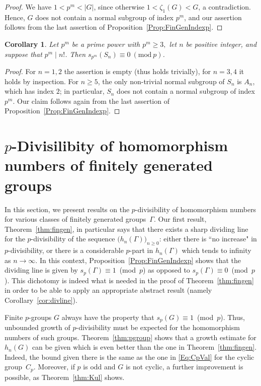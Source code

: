 \documentclass[12pt,reqno]{amsart}
\numberwithin{equation}{section}
\newtheorem{corollary}[theorem]{Corollary}
\theoremstyle{remark}
\begin{document}
\begin{proof}
We have $1 < p^m < \vert G\vert$, since otherwise $1<\zeta_1(G) < G$,
a contradiction. Hence, $G$ does not contain a normal subgroup of
index $p^m$, and our assertion  follows from 
the last assertion of Proposition~\ref{Prop:FinGenIndexp}.  
\end{proof}

\begin{corollary} \label{cor:pm2}
Let\/ $p^m$ be a prime power with $p^m\geq3,$ let $n$ be positive
integer, and suppose that $p^m \mid n!$. Then $s_{p^m}(S_n) \equiv
0~(\mathrm{mod}~p)$. 
\end{corollary}

\begin{proof}
For $n=1,2$ the assertion is empty (thus holds trivially), for $n=3,4$
it holds by inspection. For $n\geq5$, the only non-trivial normal
subgroup of $S_n$ is $A_n$, which has index $2$; in particular, $S_n$
does not contain a normal subgroup of index $p^m$. Our claim follows
again from the last assertion of Proposition~\ref{Prop:FinGenIndexp}. 
\end{proof}

\section{$p$-Divisilibity of homomorphism numbers 
of finitely generated groups}
\label{sec:appl}

\noindent In this section, we present results on the
$p$-divisibility of homomorphism numbers 
for various classes of finitely generated groups~$\Gamma$.
Our first result, Theorem~\ref{thm:fingen}, in particular says that
there exists a sharp dividing line for the $p$-divisibility
of the sequence $\big(h_n(\Gamma)\big)_{n\ge0}$: either there is
``no increase" in $p$-divisibility, or there is a considerable $p$-part
in $h_n(\Gamma)$ which tends to infinity as $n\rightarrow\infty$.
In this context,
Proposition~\ref{Prop:FinGenIndexp} shows that the dividing line
is given by $s_p(\Gamma)\equiv 1$~(mod~$p$) as opposed to
$s_p(\Gamma)\equiv 0$~(mod~$p$). This dichotomy is indeed
what is needed in the proof of Theorem~\ref{thm:fingen} 
in order to be able to apply an appropriate 
abstract result (namely Corollary~\ref{cor:divline}).

Finite $p$-groups $G$ always have the property
that $s_p(G)\equiv 1$~(mod~$p$). Thus, unbounded growth of $p$-divisibility
must be expected for the homomorphism numbers of such groups.
Theorem~\ref{thm:pgroup} shows that a
growth estimate for $h_n(G)$ can be given which is even better than
the one in Theorem~\ref{thm:fingen}. Indeed,
the bound given there is the same as the one in
\eqref{Eq:CpVal} for the cyclic group~$C_p$. 
Moreover, if $p$ is odd and $G$ is not cyclic, a further improvement
is possible, as Theorem~\ref{thm:Kul} shows.
\end{document}
